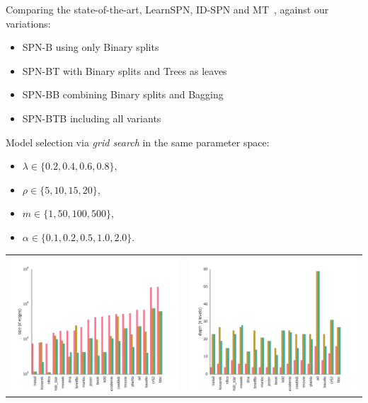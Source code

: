 \documentclass[final]{beamer}
\begin{document}
\begin{frame}{}
\begin{textblock}{25.7}
\begin{itemize}
    \end{itemize}\bigskip
    
    Comparing the state-of-the-art, \textsf{LearnSPN},
    \textsf{ID-SPN} and \textsf{MT}~\parencite{Meila2000}, against our
    variations:
    
    \begin{itemize}
    \item \textsf{SPN-B} using only \textsf{B}inary splits
    \item \textsf{SPN-BT} with \textsf{B}inary splits and \textsf{T}rees as leaves
    \item \textsf{SPN-BB} combining \textsf{B}inary splits and \textsf{B}agging
      \item \textsf{SPN-BTB} including all variants
    \end{itemize}\bigskip
    
    Model selection via \textit{grid search} in the same parameter
    space:
    \begin{minipage}[t]{0.35\linewidth}
      \begin{itemize}
      \item $\lambda \in \{0.2, 0.4, 0.6, 0.8\}$,
      \item $\rho \in \{5, 10, 15, 20\}$, 
      \end{itemize}
    \end{minipage}\begin{minipage}[t]{0.5\linewidth}
      \begin{itemize}
      \item $m \in \{1, 50, 100, 500\}$, 
      \item $\alpha \in \{ 0.1, 0.2, 0.5, 1.0, 2.0\}$.
      \end{itemize}
    \end{minipage}

    \begin{table}[ht]
      \setlength{\tabcolsep}{30pt}  
      \centering
      \begin{tabular}{c c}
        \includegraphics[width=0.4\linewidth]{figures/edges-comp.pdf}&\includegraphics[width=0.4\linewidth]{figures/levels-comp.pdf}
      \end{tabular}
    \end{table}
  



\end{textblock}
\end{frame}
\end{document}
